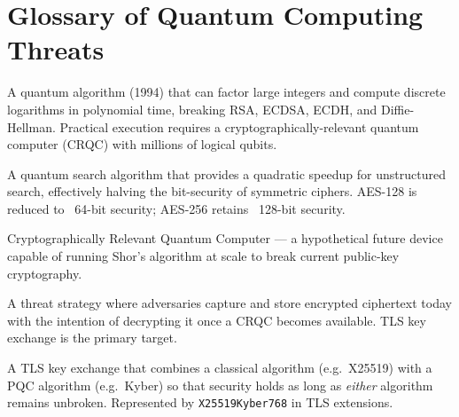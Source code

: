 \section{Glossary of Quantum Computing Threats}
\label{sec:quantum_threats}

\begin{description}[noitemsep, leftmargin=2cm]
  \item[Shor's Algorithm] A quantum algorithm (1994) that can factor large
    integers and compute discrete logarithms in polynomial time, breaking
    RSA, ECDSA, ECDH, and Diffie-Hellman. Practical execution requires a
    cryptographically-relevant quantum computer (CRQC) with millions of
    logical qubits.
  \item[Grover's Algorithm] A quantum search algorithm that provides a
    quadratic speedup for unstructured search, effectively halving the
    bit-security of symmetric ciphers. AES-128 is reduced to ~64-bit
    security; AES-256 retains ~128-bit security.
  \item[CRQC] Cryptographically Relevant Quantum Computer — a hypothetical
    future device capable of running Shor's algorithm at scale to break
    current public-key cryptography.
  \item[Harvest Now, Decrypt Later (HNDL)] A threat strategy where adversaries
    capture and store encrypted ciphertext today with the intention of
    decrypting it once a CRQC becomes available. TLS key exchange is the
    primary target.
  \item[Hybrid Key Exchange] A TLS key exchange that combines a classical
    algorithm (e.g.\ X25519) with a PQC algorithm (e.g.\ Kyber) so that
    security holds as long as \textit{either} algorithm remains unbroken.
    Represented by \texttt{X25519Kyber768} in TLS extensions.
\end{description}
